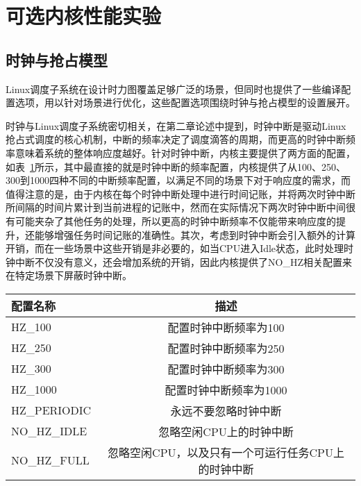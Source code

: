 \section{可选内核性能实验}

\subsection{时钟与抢占模型}

Linux调度子系统在设计时力图覆盖足够广泛的场景，但同时也提供了一些编译配置选项，用以针对场景进行优化，这些配置选项围绕时钟与抢占模型的设置展开。

时钟与Linux调度子系统密切相关，在第二章论述中提到，时钟中断是驱动Linux抢占式调度的核心机制，中断的频率决定了调度滴答的周期，而更高的时钟中断频率意味着系统的整体响应度越好。针对时钟中断，内核主要提供了两方面的配置，如表~\ref{tab:config_hz}所示，其中最直接的就是时钟中断的频率配置，内核提供了从100、250、300到1000四种不同的中断频率配置，以满足不同的场景下对于响应度的需求，而值得注意的是，由于内核在每个时钟中断处理中进行时间记账，并将两次时钟中断所间隔的时间片累计到当前进程的记账中，然而在实际情况下两次时钟中断中间很有可能夹杂了其他任务的处理，所以更高的时钟中断频率不仅能带来响应度的提升，还能够增强任务时间记账的准确性。其次，考虑到时钟中断会引入额外的计算开销，而在一些场景中这些开销是非必要的，如当CPU进入Idle状态，此时处理时钟中断不仅没有意义，还会增加系统的开销，因此内核提供了NO\_HZ相关配置来在特定场景下屏蔽时钟中断。

\begin{table}
    \label{tab:config_hz}
    \footnotesize%
    \setlength{\tabcolsep}{4pt}%
    \renewcommand{\arraystretch}{1.5}%
    \centering
    \begin{tabular}{lc}
        \hline
        配置名称 & 描述 \\
        \hline
        HZ\_100  & 配置时钟中断频率为100  \\
        HZ\_250  & 配置时钟中断频率为250 \\
        HZ\_300  & 配置时钟中断频率为300 \\
        HZ\_1000 & 配置时钟中断频率为1000 \\
        HZ\_PERIODIC & 永远不要忽略时钟中断 \\
        NO\_HZ\_IDLE & 忽略空闲CPU上的时钟中断 \\
        NO\_HZ\_FULL & 忽略空闲CPU，以及只有一个可运行任务CPU上的时钟中断 \\
        \hline
    \end{tabular}
\end{table}

